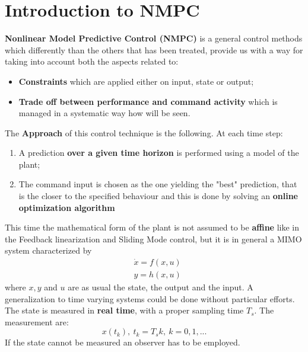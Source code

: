 \section{Introduction to NMPC}
\textbf{Nonlinear Model Predictive Control (NMPC)} is a general control methods which differently than the others that has been treated, provide us with a way for taking into account both the aspects related to: 
\begin{itemize}
    \item \textbf{Constraints} which are applied either on input, state or output; 
    \item \textbf{Trade off between performance and command activity} which is managed in a systematic way how will be seen.
\end{itemize}
The \textbf{Approach} of this control technique is the following. At each time step: 
\begin{enumerate}
    \item A prediction \textbf{over a given time horizon} is performed using a model of the plant; 
    \item The command input is chosen as the one yielding the "best" prediction, that is the closer to the specified behaviour and this is done by solving an \textbf{online optimization algorithm}
\end{enumerate}

This time the mathematical form of the plant is not assumed to be \textbf{affine} like in the Feedback linearization and Sliding Mode control, but it is in general a MIMO system characterized by
\begin{equation} \label{eq: MIMO_system}
    \begin{aligned}
        &\dot{x}=f(x,u)\\
        &y=h(x,u)
    \end{aligned}
\end{equation}
where $x, y$ and $u$ are as usual the state, the output and the input. A generalization to time varying systems could be done without particular efforts.\\
The state is measured in \textbf{real time}, with a proper sampling time $T_s$. The measurement are:
$$x(t_k), \ t_k=T_sk, \  k=0,1, ...$$
If the state cannot be measured an observer has to be employed. 

